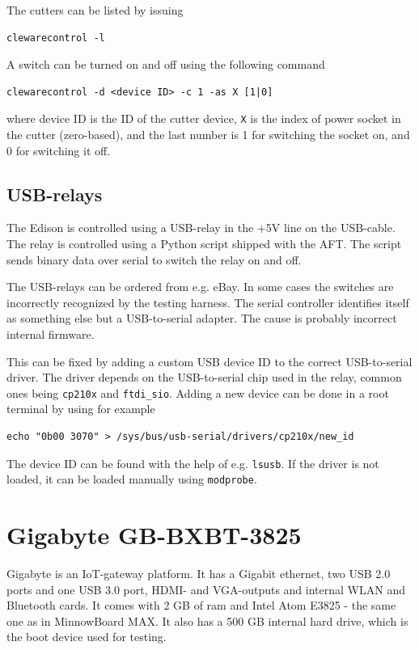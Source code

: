 \documentclass[a4paper,11pt]{article}
\newcommand{\cmd}[1]{\texttt{#1}}
\begin{document}
The cutters can be listed by issuing
\begin{lstlisting}
clewarecontrol -l
\end{lstlisting}

A switch can be turned on and off using the following command
\begin{lstlisting}
clewarecontrol -d <device ID> -c 1 -as X [1|0]
\end{lstlisting}
where device ID is the ID of the cutter device, \cmd{X} is the index of power socket in the cutter (zero-based), and the last number is 1 for switching the socket on, and 0 for switching it off.

\subsection{USB-relays}
The Edison is controlled using a USB-relay in the +5V line on the USB-cable. The relay is controlled using a Python script shipped with the AFT. The script sends binary data over serial to switch the relay on and off.

The USB-relays can be ordered from e.g. eBay. In some cases the switches are incorrectly recognized by the testing harness. The serial controller identifies itself as something else but a USB-to-serial adapter. The cause is probably incorrect internal firmware.

This can be fixed by adding a custom USB device ID to the correct USB-to-serial driver. The driver depends on the USB-to-serial chip used in the relay, common ones being \cmd{cp210x} and \cmd{ftdi\_sio}. Adding a new device can be done in a root terminal by using for example
\begin{lstlisting}
echo "0b00 3070" > /sys/bus/usb-serial/drivers/cp210x/new_id
\end{lstlisting}
The device ID can be found with the help of e.g. \cmd{lsusb}. If the driver is not loaded, it can be loaded manually using \cmd{modprobe}.

\pagebreak

\section{Gigabyte GB-BXBT-3825}
\label{gigabyte}

Gigabyte is an IoT-gateway platform. It has a Gigabit ethernet, two USB 2.0 ports and one USB 3.0 port, HDMI- and VGA-outputs and internal WLAN and Bluetooth cards. It comes with 2 GB of ram and Intel Atom E3825 - the same one as in MinnowBoard MAX. It also has a 500 GB internal hard drive, which is the boot device used for testing.
\end{document}
